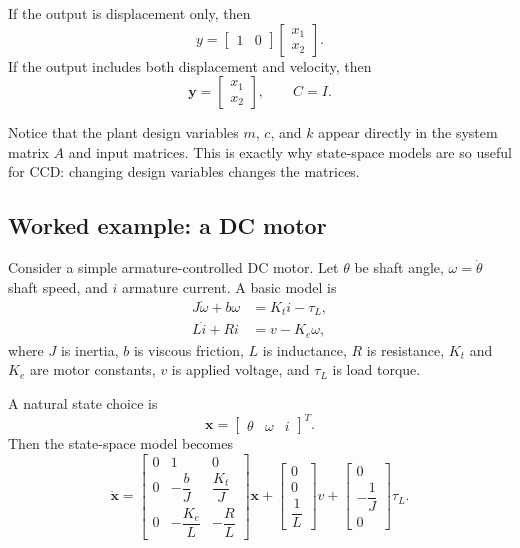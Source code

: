 \documentclass[11pt]{article}
\newcommand{\vect}[1]{\boldsymbol{#1}}
\newcommand{\state}{\vect{x}}
\newcommand{\outy}{\vect{y}}
\begin{document}
If the output is displacement only, then
\begin{equation}
 y = \begin{bmatrix}1 & 0\end{bmatrix}
 \begin{bmatrix}x_1\\x_2\end{bmatrix}.
\end{equation}
If the output includes both displacement and velocity, then
\begin{equation}
 \outy = \begin{bmatrix}x_1\\x_2\end{bmatrix},
 \qquad C=I.
\end{equation}

Notice that the plant design variables $m$, $c$, and $k$ appear directly in the system matrix $A$ and input matrices. This is exactly why state-space models are so useful for CCD: changing design variables changes the matrices.

\subsection{Worked example: a DC motor}

Consider a simple armature-controlled DC motor. Let $\theta$ be shaft angle, $\omega=\dot{\theta}$ shaft speed, and $i$ armature current. A basic model is
\begin{align}
J\dot{\omega} + b\omega &= K_t i - \tau_L, \\
L\dot{i} + R i &= v - K_e \omega,
\end{align}
where $J$ is inertia, $b$ is viscous friction, $L$ is inductance, $R$ is resistance, $K_t$ and $K_e$ are motor constants, $v$ is applied voltage, and $\tau_L$ is load torque.

A natural state choice is
\begin{equation}
\state = \begin{bmatrix}\theta & \omega & i\end{bmatrix}^T.
\end{equation}
Then the state-space model becomes
\begin{equation}
\dot{\state}=
\begin{bmatrix}
0 & 1 & 0 \\
0 & -\dfrac{b}{J} & \dfrac{K_t}{J} \\
0 & -\dfrac{K_e}{L} & -\dfrac{R}{L}
\end{bmatrix}\state
+
\begin{bmatrix}
0 \\
0 \\
\dfrac{1}{L}
\end{bmatrix}v
+
\begin{bmatrix}
0 \\
-\dfrac{1}{J} \\
0
\end{bmatrix}\tau_L.
\end{equation}
\end{document}

